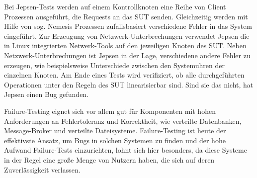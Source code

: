 \documentclass[12pt,a4paper]{report}
\begin{document}
Bei Jepsen-Tests werden auf einem Kontrollknoten eine Reihe von Client Prozessen ausgeführt, die Requests an das SUT senden.
Gleichzeitig werden mit Hilfe von sog. Nemesis Prozessen zufallsbasiert verschiedene Fehler in das System eingeführt. Zur
Erzeugung von Netzwerk-Unterbrechungen verwendet Jepsen die in Linux integrierten Netwerk-Tools auf den jeweiligen Knoten des SUT.
Neben Netzwerk-Unterbrechungen ist Jepsen in der Lage, verschiedene andere Fehler zu erzeugen, wie beispielsweise Unterschiede
zwischen den Systemuhren der einzelnen Knoten.  Am Ende eines Tests wird verifiziert, ob alle durchgeführten Operationen unter den
Regeln des SUT linearisierbar sind. Sind sie das nicht, hat Jepsen einen Bug gefunden. \cite{jepsen_github}

Failure-Testing eignet sich vor allem gut für Komponenten mit hohen Anforderungen an Fehlertoleranz und Korrektheit, wie verteilte
Datenbanken, Message-Broker und verteilte Dateisysteme. Failure-Testing ist heute der effektivste Ansatz, um Bugs in solchen
Systemen zu finden \cite{abstracting_the_geniuses} und der hohe Aufwand Failure-Tests einzurichten, lohnt sich hier besonders, da
diese Systeme in der Regel eine große Menge von Nutzern haben, die sich auf deren Zuverlässigkeit verlassen.
\end{document}
